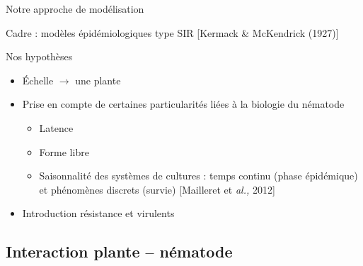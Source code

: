 \begin{frame}{Notre approche de modélisation}
\begin{center}
  \vspace{3mm}
Cadre : modèles épidémiologiques type SIR \textcolor{shadecolor}{{\small[Kermack \& McKendrick (1927)]}}
   \begin{block}{ Nos hypothèses}
       \begin{itemize}[itemsep=10pt]
\item Échelle  $\rightarrow$	une plante 
\item Prise en compte de certaines particularités liées à la biologie du nématode
{\small\begin{itemize}[itemsep=10pt, label=$\rightarrow$]
\item Latence
\item Forme libre
\item Saisonnalité des systèmes de cultures : temps  continu (phase épidémique) et phénomènes discrets (survie) \textcolor{shadecolor}{{\small[Mailleret et \textit{al.,} 2012]}} \end{itemize}}
\item  Introduction résistance et  virulents
       \end{itemize}   
       \end{block} 

\end{center}

           \end{frame}
\subsection{Interaction plante  -- nématode}


